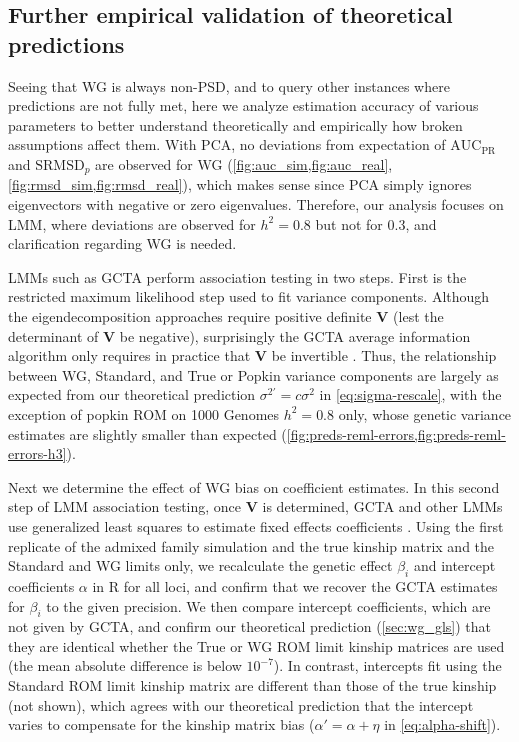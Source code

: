 \documentclass[11pt]{article}
\newcommand{\rmsd}{\text{SRMSD}_p}
\newcommand{\auc}{\text{AUC}_\text{PR}}
\begin{document}
\begin{linenumbers}
\subsection{Further empirical validation of theoretical predictions}

Seeing that WG is always non-PSD, and to query other instances where predictions are not fully met, here we analyze estimation accuracy of various parameters to better understand theoretically and empirically how broken assumptions affect them.
With PCA, no deviations from expectation of $\auc$ and $\rmsd$ are observed for WG (\cref{fig:auc_sim,fig:auc_real}, \cref{fig:rmsd_sim,fig:rmsd_real}), which makes sense since PCA simply ignores eigenvectors with negative or zero eigenvalues.
Therefore, our analysis focuses on LMM, where deviations are observed for $h^2=0.8$ but not for 0.3, and clarification regarding WG is needed.

LMMs such as GCTA perform association testing in two steps.
First is the restricted maximum likelihood step used to fit variance components.
Although the eigendecomposition approaches \citep{kang_efficient_2008, lippert_fast_2011, svishcheva_rapid_2012, zhou_genome-wide_2012, sul_population_2018} require positive definite $\mathbf{V}$ (lest the determinant of $\mathbf{V}$ be negative), surprisingly the GCTA average information algorithm only requires in practice that $\mathbf{V}$ be invertible \citep{yang_gcta:_2011}.
Thus, the relationship between WG, Standard, and True or Popkin variance components are largely as expected from our theoretical prediction $\sigma^{2\prime} = c \sigma^2$ in \cref{eq:sigma-rescale}, with the exception of popkin ROM on 1000 Genomes $h^2=0.8$ only, whose genetic variance estimates are slightly smaller than expected (\cref{fig:preds-reml-errors,fig:preds-reml-errors-h3}).

Next we determine the effect of WG bias on coefficient estimates.
In this second step of LMM association testing, once $\mathbf{V}$ is determined, GCTA and other LMMs use generalized least squares to estimate fixed effects coefficients \citep{kang_efficient_2008, kang_variance_2010, yang_advantages_2014}.
Using the first replicate of the admixed family simulation and the true kinship matrix and the Standard and WG limits only, we recalculate the genetic effect $\beta_i$ and intercept coefficients $\alpha$ in R for all loci, and confirm that we recover the GCTA estimates for $\beta_i$ to the given precision.
We then compare intercept coefficients, which are not given by GCTA, and confirm our theoretical prediction (\cref{sec:wg_gls}) that they are identical whether the True or WG ROM limit kinship matrices are used (the mean absolute difference is below $10^{-7}$).
In contrast, intercepts fit using the Standard ROM limit kinship matrix are different than those of the true kinship (not shown), which agrees with our theoretical prediction that the intercept varies to compensate for the kinship matrix bias ($\alpha' = \alpha + \eta$ in \cref{eq:alpha-shift}).


\end{linenumbers}
\end{document}

